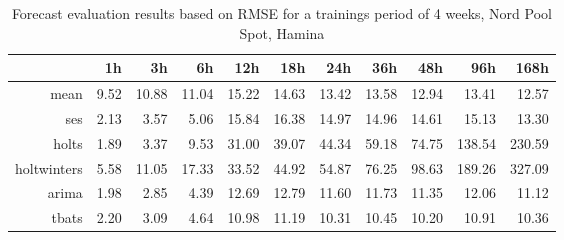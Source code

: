 \begin{table}[ht]
\centering
\begin{tabular}{rrrrrrrrrrr}
  \hline
 & 1h & 3h & 6h & 12h & 18h & 24h & 36h & 48h & 96h & 168h \\ 
  \hline
mean & 9.52 & 10.88 & 11.04 & 15.22 & 14.63 & 13.42 & 13.58 & 12.94 & 13.41 & 12.57 \\ 
  ses & 2.13 & 3.57 & 5.06 & 15.84 & 16.38 & 14.97 & 14.96 & 14.61 & 15.13 & 13.30 \\ 
  holts & 1.89 & 3.37 & 9.53 & 31.00 & 39.07 & 44.34 & 59.18 & 74.75 & 138.54 & 230.59 \\ 
  holtwinters & 5.58 & 11.05 & 17.33 & 33.52 & 44.92 & 54.87 & 76.25 & 98.63 & 189.26 & 327.09 \\ 
  arima & 1.98 & 2.85 & 4.39 & 12.69 & 12.79 & 11.60 & 11.73 & 11.35 & 12.06 & 11.12 \\ 
  tbats & 2.20 & 3.09 & 4.64 & 10.98 & 11.19 & 10.31 & 10.45 & 10.20 & 10.91 & 10.36 \\ 
   \hline
\end{tabular}
\caption{Forecast evaluation results based on RMSE for a trainings period of 4 weeks, Nord Pool Spot, Hamina}
\label{tab:app_results_hamina_4weeks}
\end{table}






